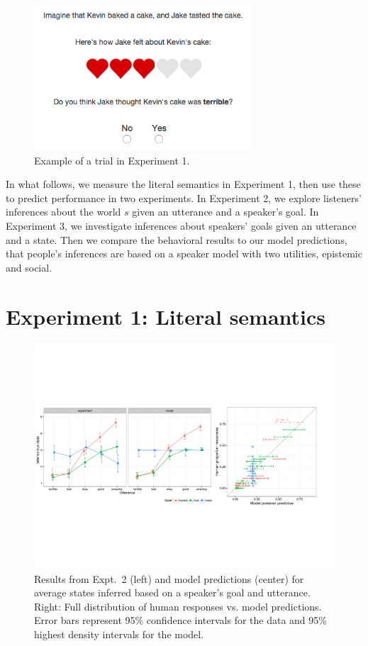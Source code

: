 \documentclass[10pt,letterpaper]{article}
\begin{document}
\begin{figure}[th]
\begin{centering}
\includegraphics[width=3.2in]{figures/example.png}
\caption{\label{fig:ex} Example of a trial in Experiment 1.}
\end{centering}
\end{figure}


In what follows, we measure the literal semantics in Experiment 1, then use these to predict performance in two experiments. In Experiment 2, we explore listeners' inferences about the world $s$ given an utterance and a speaker's goal. In Experiment 3, we investigate inferences about speakers' goals given an utterance and a state. 
Then we compare the behavioral results to our model predictions, that people's inferences are based on a speaker model with two utilities, epistemic and social. 

\section{Experiment 1: Literal semantics}

\begin{figure}[b]
\begin{centering}
\includegraphics[width=\textwidth]{figures/exp2.pdf}
\caption{\label{fig:expt2} Results from Expt.~2 (left) and model predictions (center) for average states inferred based on a speaker's goal and utterance. Right: Full distribution of human responses vs. model predictions. Error bars represent 95\% confidence intervals for the data and 95\% highest density intervals for the model.}
\end{centering}
\end{figure}
\end{document}
